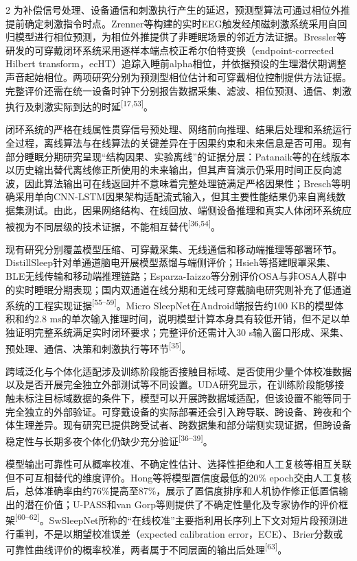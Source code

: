 \documentclass[UTF8,zihao=5,fontset=none]{ctexart}
\newcommand{\hei}{\CJKfamily{hei}}
\newcommand{\levelthree}[1]{%
  \par\noindent{\hei\fontsize{10pt}{12pt}\selectfont\bfseries #1}}
\newcommand{\refcite}[1]{\nolinebreak[4]\textsuperscript{[#1]}}
\begin{document}
\begin{multicols}{2}
为补偿信号处理、设备通信和刺激执行产生的延迟，预测型算法可通过相位外推提前确定刺激指令时点。Zrenner等构建的实时EEG触发经颅磁刺激系统采用自回归模型进行相位预测，为相位外推提供了非睡眠场景的邻近方法证据。Bressler等研发的可穿戴闭环系统采用逐样本端点校正希尔伯特变换（endpoint-corrected Hilbert transform，ecHT）追踪入睡前alpha相位，并依据预设的生理潜伏期调整声音起始相位。两项研究分别为预测型相位估计和可穿戴相位控制提供方法证据。完整评价还需在统一设备时钟下分别报告数据采集、滤波、相位预测、通信、刺激执行及刺激实际到达的时延\refcite{17,53}。\par

\levelthree{2.2.5 在线部署、输出可靠性与闭环评价体系}
闭环系统的严格在线属性贯穿信号预处理、网络前向推理、结果后处理和系统运行全过程，离线算法与在线算法的关键差异在于因果约束和未来信息是否可用。现有部分睡眠分期研究呈现“结构因果、实验离线”的证据分层：Patanaik等的在线版本以历史输出替代离线修正所使用的未来输出，但其声音演示仍采用时间正反向滤波，因此算法输出可在线返回并不意味着完整处理链满足严格因果性；Bresch等明确采用单向CNN-LSTM因果架构适配流式输入，但其主要性能结果仍来自离线数据集测试。由此，因果网络结构、在线回放、端侧设备推理和真实人体闭环系统应被视为不同层级的技术证据，不能相互替代\refcite{36,54}。\par

现有研究分别覆盖模型压缩、可穿戴采集、无线通信和移动端推理等部署环节。DistillSleep针对单通道脑电开展模型蒸馏与端侧评价；Hsieh等搭建眼罩采集、BLE无线传输和移动端推理链路；Esparza-Iaizzo等分别评价OSA与非OSA人群中的实时睡眠分期表现；国内双通道在线分期和无线可穿戴脑电研究则补充了低通道系统的工程实现证据\refcite{55--59}。Micro SleepNet在Android端报告约100 KB的模型体积和约2.8 ms的单次输入推理时间，说明模型计算本身具有较低开销，但不足以单独证明完整系统满足实时闭环要求；完整评价还需计入30 s输入窗口形成、采集、预处理、通信、决策和刺激执行等环节\refcite{35}。\par

跨域泛化与个体化适配涉及训练阶段能否接触目标域、是否使用少量个体校准数据以及是否开展完全独立外部测试等不同设置。UDA研究显示，在训练阶段能够接触未标注目标域数据的条件下，模型可以开展跨数据域适配，但该设置不能等同于完全独立的外部验证。可穿戴设备的实际部署还会引入跨导联、跨设备、跨夜和个体生理差异。现有研究已提供跨受试者、跨数据集和部分端侧实现证据，但跨设备稳定性与长期多夜个体化仍缺少充分验证\refcite{36--39}。\par

模型输出可靠性可从概率校准、不确定性估计、选择性拒绝和人工复核等相互关联但不可互相替代的维度评价。Hong等将模型置信度最低的20\% epoch交由人工复核后，总体准确率由约76\%提高至87\%，展示了置信度排序和人机协作修正低置信输出的潜在价值；U-PASS和van Gorp等则提供了不确定性量化及专家协作的评价框架\refcite{60--62}。SwSleepNet所称的“在线校准”主要指利用长序列上下文对短片段预测进行重判，不是以期望校准误差（expected calibration error，ECE）、Brier分数或可靠性曲线评价的概率校准，两者属于不同层面的输出后处理\refcite{63}。\par


\end{multicols}
\end{document}
